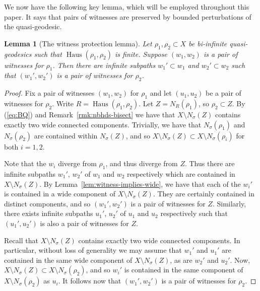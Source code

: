 \documentclass[11pt,a4paper]{amsart}
\DeclareMathOperator{\dHaus}{Haus}
\newtheorem{lemma}[theorem]{Lemma}
\theoremstyle{definition}
\newcommand{\property}{(\ref{eq:BQ})}
\begin{document}
We now have the following key lemma, which will be employed throughout this paper. It says that pairs of witnesses are preserved by bounded perturbations of the quasi-geodesic.



\begin{lemma}[The witness protection lemma]\label{lem:witness-protection}
    Let $\rho_1, \rho_2 \subset X$ be bi-infinite quasi-geodesics such that $\dHaus(\rho_1, \rho_2)$ is finite. Suppose $(w_1, w_2)$ is a pair of witnesses for $\rho_1$. Then there are infinite subpaths $w_1'\subset w_1$ and $w_2' \subset w_2$ such that $(w_1', w_2')$ is a pair of witnesses for $\rho_2$. 
\end{lemma}

\begin{proof}
    Fix a pair of witnesses $(w_1, w_2)$ for $\rho_1$ and let $(u_1, u_2)$ be a pair of witnesses for $\rho_2$. 
    Write $R = \dHaus(\rho_1, \rho_2)$. Let $Z = N_R(\rho_1)$, so $\rho_2 \subset Z$. By \property{} and Remark~\ref{rmk:nbhds-bisect} we have that $X \setminus N_\sigma(Z)$ contains exactly two wide connected components. Trivially, we have that $N_\sigma(\rho_1)$ and $ N_\sigma(\rho_2)$ are contained within $N_\sigma(Z)$, and so 
    $
    X\setminus N_\sigma(Z) \subset X \setminus N_\sigma(\rho_i)
    $
    for both $i =1,2$. 

    Note that the $w_i$ diverge from $\rho_1$, and thus diverge from $Z$. Thus there are infinite subpaths $w_1'$, $w_2'$ of $w_1$ and $w_2$ respectively which are contained in $X \setminus N_\sigma(Z)$. By Lemma~\ref{lem:witness-implies-wide}, we have that each of the $w_i'$ is contained in a wide component of  $X\setminus N_\sigma(Z)$. They are certainly contained in distinct components, and so $(w_1', w_2')$ is a pair of witnesses for $Z$. Similarly, there exists infinite subpaths $u_1'$, $u_2'$ of $u_1$ and $u_2$ respectively such that $(u_1', u_2')$ is also a pair of witnesses for $Z$. 
    
    Recall that $X \setminus N_\sigma(Z)$ contains exactly two wide connected components. In particular, without loss of generality we may assume that $w_1'$ and $u_1'$ are contained in the same wide component of $X\setminus N_\sigma(Z)$, as are $w_2'$ and $u_2'$. 
    Now, $X\setminus N_\sigma(Z) \subset X \setminus N_\sigma(\rho_2)$, and so $w_i'$ is contained in the same component of $X \setminus N_\sigma(\rho_2)$ as $u_i$. It follows now that $(w_1', w_2')$ is a pair of witnesses for $\rho_2$.  
\end{proof}
\end{document}
